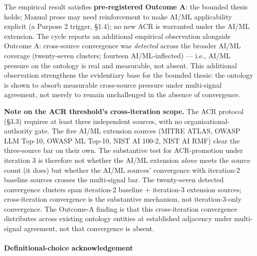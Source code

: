 \documentclass[
]{article}
\begin{document}
The empirical result satisfies \textbf{pre-registered Outcome A}: the
bounded thesis holds; Manual prose may need reinforcement to make AI/ML
applicability explicit (a Purpose 2 trigger, §1.4); no new ACR is
warranted under the AI/ML extension. The cycle reports an additional
empirical observation alongside Outcome A: cross-source convergence was
\emph{detected} across the broader AI/ML coverage (twenty-seven
clusters; fourteen AI/ML-inflected) --- i.e., AI/ML pressure on the
ontology is real and measurable, not absent. This additional observation
strengthens the evidentiary base for the bounded thesis: the ontology is
shown to absorb measurable cross-source pressure under multi-signal
agreement, not merely to remain unchallenged in the absence of
convergence.

\textbf{Note on the ACR threshold's cross-iteration scope.} The ACR
protocol (§3.3) requires at least three independent sources, with no
organisational-authority gate. The five AI/ML extension sources (MITRE
ATLAS, OWASP LLM Top-10, OWASP ML Top-10, NIST AI 100-2, NIST AI RMF)
clear the three-source bar on their own. The substantive test for
ACR-promotion under iteration 3 is therefore not whether the AI/ML
extension \emph{alone} meets the source count (it does) but whether the
AI/ML sources' convergence with iteration-2 baseline sources crosses the
multi-signal bar. The twenty-seven detected convergence clusters span
iteration-2 baseline + iteration-3 extension sources; cross-iteration
convergence is the substantive mechanism, not iteration-3-only
convergence. The Outcome-A finding is that this cross-iteration
convergence distributes across existing ontology entities at established
adjacency under multi-signal agreement, not that convergence is absent.

\paragraph{Definitional-choice
acknowledgement}\label{definitional-choice-acknowledgement}
\end{document}
